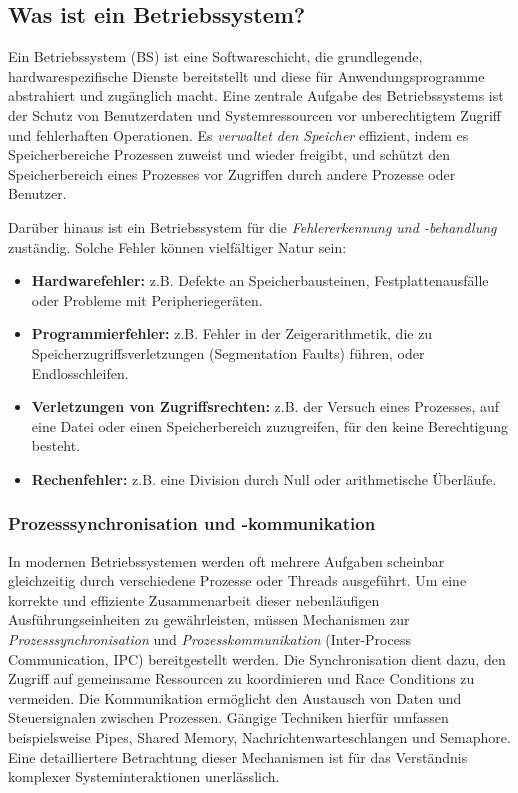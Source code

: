 \subsection{Was ist ein Betriebssystem?}

Ein Betriebssystem (BS) ist eine Softwareschicht, die grundlegende, hardwarespezifische Dienste bereitstellt und diese für Anwendungsprogramme abstrahiert und zugänglich macht. Eine zentrale Aufgabe des Betriebssystems ist der Schutz von Benutzerdaten und Systemressourcen vor unberechtigtem Zugriff und fehlerhaften Operationen. Es \textit{verwaltet den Speicher} effizient, indem es Speicherbereiche Prozessen zuweist und wieder freigibt, und schützt den Speicherbereich eines Prozesses vor Zugriffen durch andere Prozesse oder Benutzer.

Darüber hinaus ist ein Betriebssystem für die \textit{Fehlererkennung und -behandlung} zuständig. Solche Fehler können vielfältiger Natur sein:
\begin{itemize}
\item \textbf{Hardwarefehler:} z.B. Defekte an Speicherbausteinen, Festplattenausfälle oder Probleme mit Peripheriegeräten.
\item \textbf{Programmierfehler:} z.B. Fehler in der Zeigerarithmetik, die zu Speicherzugriffsverletzungen (Segmentation Faults) führen, oder Endlosschleifen.
\item \textbf{Verletzungen von Zugriffsrechten:} z.B. der Versuch eines Prozesses, auf eine Datei oder einen Speicherbereich zuzugreifen, für den keine Berechtigung besteht.
\item \textbf{Rechenfehler:} z.B. eine Division durch Null oder arithmetische Überläufe.
\end{itemize}

\subsubsection{Prozesssynchronisation und -kommunikation}

In modernen Betriebssystemen werden oft mehrere Aufgaben scheinbar gleichzeitig durch verschiedene Prozesse oder Threads ausgeführt. Um eine korrekte und effiziente Zusammenarbeit dieser nebenläufigen Ausführungseinheiten zu gewährleisten, müssen Mechanismen zur \textit{Prozesssynchronisation} und \textit{Prozesskommunikation} (Inter-Process Communication, IPC) bereitgestellt werden. Die Synchronisation dient dazu, den Zugriff auf gemeinsame Ressourcen zu koordinieren und Race Conditions zu vermeiden. Die Kommunikation ermöglicht den Austausch von Daten und Steuersignalen zwischen Prozessen. Gängige Techniken hierfür umfassen beispielsweise Pipes, Shared Memory, Nachrichtenwarteschlangen und Semaphore. Eine detailliertere Betrachtung dieser Mechanismen ist für das Verständnis komplexer Systeminteraktionen unerlässlich.

